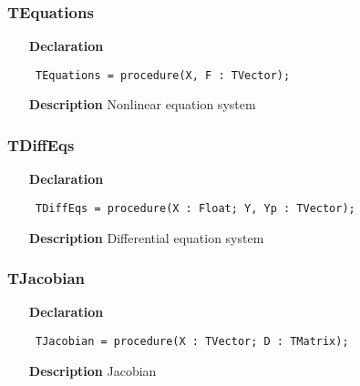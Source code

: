 \documentclass[12pt,a4paper,oneside]{report}
\newcommand{\declarationitem}[1]{\textbf{#1}}
\newcommand{\descriptiontitle}[1]{\textbf{#1}}
\newcommand{\code}[1]{\texttt{#1}}
\begin{document}
\subsubsection{TEquations}
\label{utypes-TEquations}
\begin{itemize}\item[\declarationitem{Declaration}\hfill]
	\begin{flushleft}
		\code{
			TEquations = procedure(X, F : TVector);}
		
	\end{flushleft}
	
	\par
	\item[\descriptiontitle{Description}]
	Nonlinear equation system
	
\end{itemize}
\subsubsection{TDiffEqs}
\label{utypes-TDiffEqs}
\begin{itemize}\item[\declarationitem{Declaration}\hfill]
	\begin{flushleft}
		\code{
			TDiffEqs = procedure(X : Float; Y, Yp : TVector);}
		
	\end{flushleft}
	
	\par
	\item[\descriptiontitle{Description}]
	Differential equation system
	
\end{itemize}
\subsubsection{TJacobian}
\label{utypes-TJacobian}
\begin{itemize}\item[\declarationitem{Declaration}\hfill]
	\begin{flushleft}
		\code{
			TJacobian = procedure(X : TVector; D : TMatrix);}
		
	\end{flushleft}
	
	\par
	\item[\descriptiontitle{Description}]
	Jacobian
	
\end{itemize}
\end{document}
